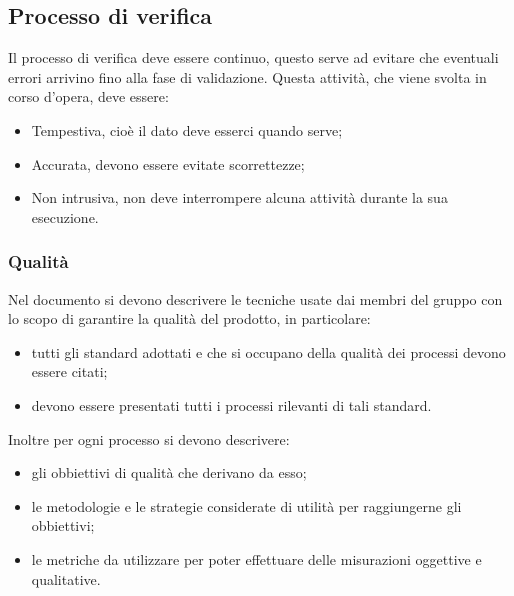 \subsection{Processo di verifica}
Il processo di verifica deve essere continuo, questo serve ad evitare che eventuali errori arrivino fino alla fase di validazione.
Questa attività, che viene svolta in corso d'opera, deve essere:
\begin{itemize}
	\item Tempestiva, cioè il dato deve esserci quando serve;
	\item Accurata, devono essere evitate scorrettezze;
	\item Non intrusiva, non deve interrompere alcuna attività durante la sua esecuzione.
\end{itemize}

	\subsubsection{Qualità}
	Nel documento \PdQ{} si devono descrivere le tecniche usate dai membri del gruppo con lo scopo di garantire la qualità del prodotto, in particolare:
	\begin{itemize}
		\item tutti gli standard adottati e che si occupano della qualità dei processi devono essere citati;
		\item devono essere presentati tutti i processi rilevanti di tali standard.
	\end{itemize}
	Inoltre per ogni processo si devono descrivere:
	\begin{itemize}
		\item gli obbiettivi di qualità che derivano da esso;
		\item le metodologie e le strategie considerate di utilità per raggiungerne gli obbiettivi;
		\item le metriche da utilizzare per poter effettuare delle misurazioni oggettive e qualitative.
	\end{itemize}

